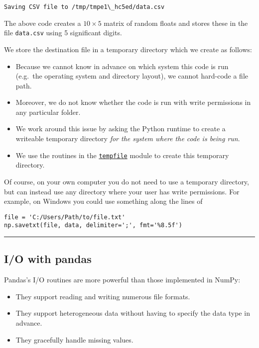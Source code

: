 \documentclass[10pt]{scrartcl}
\providecommand{\tightlist}{%
      \setlength{\itemsep}{0pt}\setlength{\parskip}{0pt}}
\begin{document}
    \begin{Verbatim}[commandchars=\\\{\}]
Saving CSV file to /tmp/tmpe1\_hc5ed/data.csv
    \end{Verbatim}

    The above code creates a \(10 \times 5\) matrix of random floats and
stores these in the file \texttt{data.csv} using 5 significant digits.

We store the destination file in a temporary directory which we create
as follows:

\begin{itemize}
\tightlist
\item
  Because we cannot know in advance on which system this code is run
  (e.g.~the operating system and directory layout), we cannot hard-code
  a file path.
\item
  Moreover, we do not know whether the code is run with write
  permissions in any particular folder.
\item
  We work around this issue by asking the Python runtime to create a
  writeable temporary directory \emph{for the system where the code is
  being run}.
\item
  We use the routines in the
  \href{https://docs.python.org/3/library/tempfile.html}{\texttt{tempfile}}
  module to create this temporary directory.
\end{itemize}

Of course, on your own computer you do not need to use a temporary
directory, but can instead use any directory where your user has write
permissions. For example, on Windows you could use something along the
lines of

\begin{verbatim}
file = 'C:/Users/Path/to/file.txt'
np.savetxt(file, data, delimiter=';', fmt='%8.5f')
\end{verbatim}

    \begin{center}\rule{0.5\linewidth}{0.5pt}\end{center}

\hypertarget{io-with-pandas}{%
\subsection{I/O with pandas}\label{io-with-pandas}}

Pandas's I/O routines are more powerful than those implemented in NumPy:

\begin{itemize}
\tightlist
\item
  They support reading and writing numerous file formats.
\item
  They support heterogeneous data without having to specify the data
  type in advance.
\item
  They gracefully handle missing values.
\end{itemize}
\end{document}
